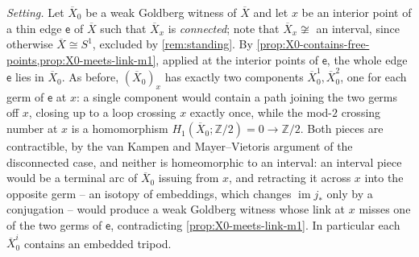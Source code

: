 \documentclass[reqno]{amsart}
\theoremstyle{definition}
\newcommand\sfe{\mathsf{e}}
\newcommand{\im}{\operatorname{im}}
\newcommand{\Z}{\mathbb{Z}}
\renewcommand{\bar}{\overline}
\numberwithin{equation}{section}
\begin{document}
\emph{Setting.} Let \(\bar X_0\) be a weak Goldberg witness of
\(\bar X\) and let \(x\) be an interior point of a thin edge
\(\sfe\) of \(\bar X\) such that \(\bar X_x\) is \emph{connected};
note that \(\bar X_x\not\cong\) an interval, since otherwise
\(\bar X\cong S^1\), excluded by \cref{rem:standing}. By
\cref{prop:X0-contains-free-points,prop:X0-meets-link-m1},
applied at the interior points of \(\sfe\), the whole edge \(\sfe\)
lies in \(\bar X_0\). As before, \((\bar X_0)_x\) has exactly
two components \(\bar X_0^1,\bar X_0^2\), one for each germ of
\(\sfe\) at \(x\): a single component would contain a path joining
the two germs off \(x\), closing up to a loop crossing \(x\)
exactly once, while the mod-\(2\) crossing number at \(x\) is a
homomorphism \(H_1(\bar X_0;\Z/2)=0\to\Z/2\). Both pieces are
contractible, by the van Kampen and Mayer--Vietoris argument of
the disconnected case, and neither is homeomorphic to an
interval: an interval piece would be a terminal arc of
\(\bar X_0\) issuing from \(x\), and retracting it across
\(x\) into the opposite germ -- an isotopy of embeddings, which
changes \(\im j_\ast\) only by a conjugation -- would produce a
weak Goldberg witness whose link at \(x\) misses one of the two
germs of \(\sfe\), contradicting \cref{prop:X0-meets-link-m1}. In
particular each \(\bar X_0^i\) contains an embedded tripod.
\end{document}

